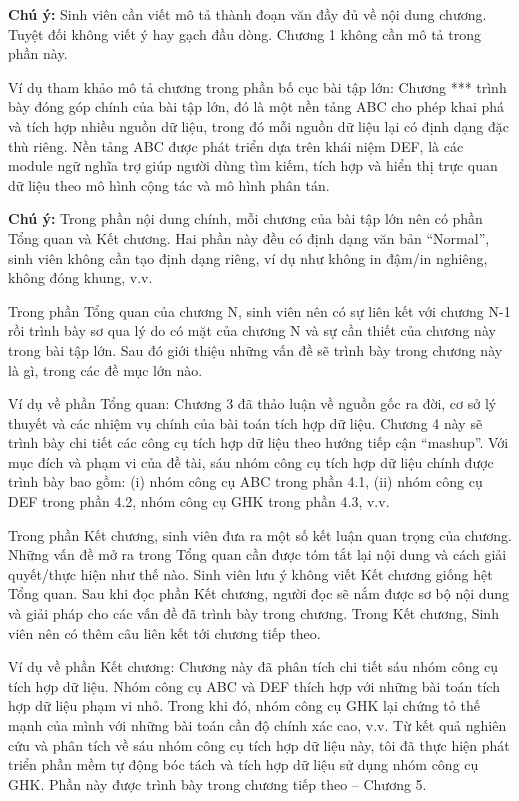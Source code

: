 \documentclass[../BTL.tex]{subfiles}
\begin{document}
\textbf{Chú ý:} Sinh viên cần viết mô tả thành đoạn văn đầy đủ về nội dung chương. Tuyệt đối không viết ý hay gạch đầu dòng. Chương 1 không cần mô tả trong phần này. 

Ví dụ tham khảo mô tả chương trong phần bố cục  bài tập lớn: Chương *** trình bày đóng góp chính của  bài tập lớn, đó là một nền tảng ABC cho phép khai phá và tích hợp nhiều nguồn dữ liệu, trong đó mỗi nguồn dữ liệu lại có định dạng đặc thù riêng. Nền tảng ABC được phát triển dựa trên khái niệm DEF, là các module ngữ nghĩa trợ giúp người dùng tìm kiếm, tích hợp và hiển thị trực quan dữ liệu theo mô hình cộng tác và mô hình phân tán.

\textbf{Chú ý:} Trong phần nội dung chính, mỗi chương của  bài tập lớn nên có phần Tổng quan và Kết chương. Hai phần này đều có định dạng văn bản “Normal”, sinh viên không cần tạo định dạng riêng, ví dụ như không in đậm/in nghiêng, không đóng khung, v.v. 

Trong phần Tổng quan của chương N, sinh viên nên có sự liên kết với chương N-1 rồi trình bày sơ qua lý do có mặt của chương N và sự cần thiết của chương này trong  bài tập lớn. Sau đó giới thiệu những vấn đề sẽ trình bày trong chương này là gì, trong các đề mục lớn nào.

Ví dụ về phần Tổng quan: Chương 3 đã thảo luận về nguồn gốc ra đời, cơ sở lý thuyết và các nhiệm vụ chính của bài toán tích hợp dữ liệu. Chương 4 này sẽ trình bày chi tiết các công cụ tích hợp dữ liệu theo hướng tiếp cận “mashup”. Với mục đích và phạm vi của đề tài, sáu nhóm công cụ tích hợp dữ liệu chính được trình bày bao gồm: (i) nhóm công cụ ABC trong phần 4.1, (ii) nhóm công cụ DEF trong phần 4.2, nhóm công cụ GHK trong phần 4.3, v.v.

Trong phần Kết chương, sinh viên đưa ra một số kết luận quan trọng của chương. Những vấn đề mở ra trong Tổng quan cần được tóm tắt lại nội dung và cách giải quyết/thực hiện như thế nào. Sinh viên lưu ý không viết Kết chương giống hệt Tổng quan. Sau khi đọc phần Kết chương, người đọc sẽ nắm được sơ bộ nội dung và giải pháp cho các vấn đề đã trình bày trong chương. Trong Kết chương, Sinh viên nên có thêm câu liên kết tới chương tiếp theo.

Ví dụ về phần Kết chương: Chương này đã phân tích chi tiết sáu nhóm công cụ tích hợp dữ liệu. Nhóm công cụ ABC và DEF thích hợp với những bài toán tích hợp dữ liệu phạm vi nhỏ. Trong khi đó, nhóm công cụ GHK lại chứng tỏ thế mạnh của mình với những bài toán cần độ chính xác cao, v.v. Từ kết quả nghiên cứu và phân tích về sáu nhóm công cụ tích hợp dữ liệu này, tôi đã thực hiện phát triển phần mềm tự động bóc tách và tích hợp dữ liệu sử dụng nhóm công cụ GHK. Phần này được trình bày trong chương tiếp theo – Chương 5.
\end{document}
